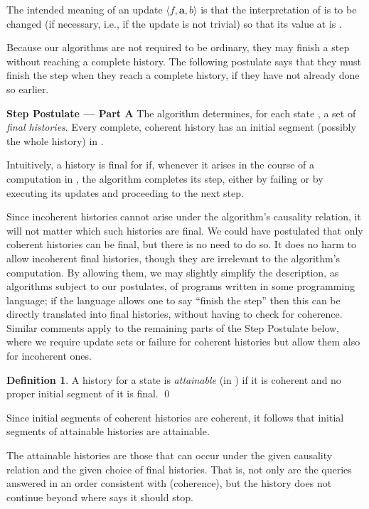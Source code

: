 \documentclass{LMCS}
\theoremstyle{definition}
\newtheorem{df}[thm]{Definition}
\newenvironment{unn}[1]{\bigskip\noindent\textbf{#1}\quad}{\par\bigskip}
\newcommand{\bld}[1]{\ensuremath{\mathbf {#1}}}
\newcommand{\sq}[1]{\ensuremath{\langle#1\rangle}}
\begin{document}
The intended meaning of an update \sq{f,\bld a,b} is that the
interpretation of  is to be changed (if necessary, i.e., if the
update is not trivial) so that its value at  is .

Because our algorithms are not required to be ordinary, they may
finish a step without reaching a complete history.  The following
postulate says that they must finish the step when they reach a
complete history, if they have not already done so earlier.

\begin{unn}{Step Postulate --- Part A}
The algorithm determines, for each state , a set  of
\emph{final histories}.  Every complete, coherent history has an
initial segment (possibly the whole history) in .
\end{unn}

Intuitively, a history is final for  if, whenever it arises in the course
of a computation in , the algorithm completes its step, either by
failing or by executing its updates and proceeding to the next step.

Since incoherent histories cannot arise under the algorithm's
causality relation, it will not matter which such histories are final.
We could have postulated that only coherent histories can be final,
but there is no need to do so.  It does no harm to allow incoherent
final histories, though they are irrelevant to the algorithm's
computation.  By allowing them, we may slightly simplify the
description, as algorithms subject to our postulates, of programs
written in some programming language; if the language allows one to
say ``finish the step'' then this can be directly translated into
final histories, without having to check for coherence.  Similar
comments apply to the remaining parts of the Step Postulate below,
where we require update sets or failure for coherent histories but
allow them also for incoherent ones.

\begin{df}   \label{att-def}
  A history for a state  is \emph{attainable} (in ) if it
  is coherent and no proper initial segment of it is final.
\qed\end{df}

Since initial segments of coherent histories are coherent, it follows
that initial segments of attainable histories are attainable.

The attainable histories are those that can occur under the given
causality relation and the given choice of final histories.  That is,
not only are the queries answered in an order consistent with
 (coherence), but the history does not continue beyond where
 says it should stop.
\end{document}
